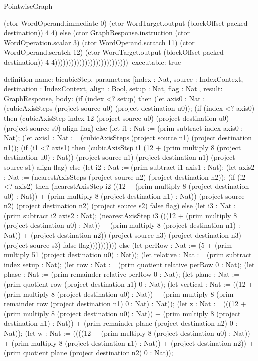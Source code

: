 \begin{lexlean}{PointwiseGraph}
\begin{semanticmodule}
{(ctor WordOperand.immediate 0) (ctor WordTarget.output (blockOffset packed destination)) 4 4) else (ctor GraphResponse.instruction (ctor WordOperation.scalar 3) (ctor WordOperand.scratch 11) (ctor WordOperand.scratch 12) (ctor WordTarget.output (blockOffset packed destination)) 4 4))))))))))))))))))))))))))),
  executable: true
}

definition{
  name: bicubicStep,
  parameters: [index : Nat, source : IndexContext, destination : IndexContext, align : Bool, setup : Nat, flag : Nat],
  result: GraphResponse,
  body: (if (index <? setup) then (let axis0 : Nat := (cubicAxisSteps (project source u0) (project destination u0));
      (if (index <? axis0) then (cubicAxisStep index 12 (project source u0) (project destination u0) (project source s0) align flag) else (let i1 : Nat := (prim subtract index axis0 : Nat);
      (let axis1 : Nat := (cubicAxisSteps (project source n1) (project destination n1));
      (if (i1 <? axis1) then (cubicAxisStep i1 (12 + (prim multiply 8 (project destination u0) : Nat)) (project source n1) (project destination n1) (project source s1) align flag) else (let i2 : Nat := (prim subtract i1 axis1 : Nat);
      (let axis2 : Nat := (nearestAxisSteps (project source n2) (project destination n2));
      (if (i2 <? axis2) then (nearestAxisStep i2 ((12 + (prim multiply 8 (project destination u0) : Nat)) + (prim multiply 8 (project destination n1) : Nat)) (project source n2) (project destination n2) (project source s2) false flag) else (let i3 : Nat := (prim subtract i2 axis2 : Nat);
      (nearestAxisStep i3 (((12 + (prim multiply 8 (project destination u0) : Nat)) + (prim multiply 8 (project destination n1) : Nat)) + (project destination n2)) (project source n3) (project destination n3) (project source s3) false flag)))))))))) else (let perRow : Nat := (5 + (prim multiply 51 (project destination u0) : Nat));
      (let relative : Nat := (prim subtract index setup : Nat);
      (let row : Nat := (prim quotient relative perRow 0 : Nat);
      (let phase : Nat := (prim remainder relative perRow 0 : Nat);
      (let plane : Nat := (prim quotient row (project destination n1) 0 : Nat);
      (let vertical : Nat := ((12 + (prim multiply 8 (project destination u0) : Nat)) + (prim multiply 8 (prim remainder row (project destination n1) 0 : Nat) : Nat));
      (let z : Nat := (((12 + (prim multiply 8 (project destination u0) : Nat)) + (prim multiply 8 (project destination n1) : Nat)) + (prim remainder plane (project destination n2) 0 : Nat));
      (let w : Nat := ((((12 + (prim multiply 8 (project destination u0) : Nat)) + (prim multiply 8 (project destination n1) : Nat)) + (project destination n2)) + (prim quotient plane (project destination n2) 0 : Nat));
}
\end{semanticmodule}
\end{lexlean}
